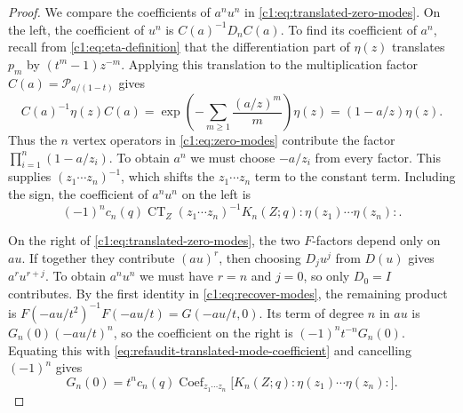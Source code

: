 \documentclass[12pt,reqno,a4paper]{amsart}
\numberwithin{equation}{section}
\numberwithin{figure}{section}
\theoremstyle{plain}
\theoremstyle{definition}
\DeclareMathOperator{\Coef}{Coef}
\begin{document}
\begin{proof}
We compare the coefficients of $a^nu^n$ in \eqref{c1:eq:translated-zero-modes}.
On the left, the coefficient of $u^n$ is $C(a)^{-1}D_nC(a)$.
To find its coefficient of $a^n$, recall from \eqref{c1:eq:eta-definition}
that the differentiation part of $\eta(z)$ translates
$p_m$ by $(t^m-1)z^{-m}$.  Applying this translation to the
multiplication factor $C(a)=\mathcal P_{a/(1-t)}$ gives
\begin{equation}\label{c1:eq:eta-conjugation}
 C(a)^{-1}\eta(z)C(a)
 =\exp\left(-\sum_{m\geq1}\frac{(a/z)^m}{m}\right)\eta(z)
 =(1-a/z)\eta(z).
\end{equation}
Thus the $n$ vertex operators in \eqref{c1:eq:zero-modes} contribute
the factor $\prod_{i=1}^n(1-a/z_i)$.  To obtain $a^n$ we must choose
$-a/z_i$ from every factor.  This supplies $(z_1\cdots z_n)^{-1}$,
which shifts the $z_1\cdots z_n$ term to the constant term.
Including the sign, the coefficient of $a^nu^n$ on the left is
\begin{equation}\label{eq:refaudit-translated-mode-coefficient}
 (-1)^nc_n(q)\operatorname{CT}_Z
 (z_1\cdots z_n)^{-1}K_n(Z;q):\eta(z_1)\cdots\eta(z_n):.
\end{equation}

On the right of \eqref{c1:eq:translated-zero-modes}, the two $F$-factors
depend only on $au$.  If together they contribute $(au)^r$, then
choosing $D_j u^j$ from $D(u)$ gives $a^r u^{r+j}$.
To obtain $a^nu^n$ we must have $r=n$ and $j=0$, so only $D_0=I$
contributes.  By the first identity in \eqref{c1:eq:recover-modes},
the remaining product is
$F(-au/t^2)^{-1}F(-au/t)=G(-au/t,0)$.
Its term of degree $n$ in $au$ is $G_n(0)(-au/t)^n$, so the coefficient
on the right is $(-1)^nt^{-n}G_n(0)$.  Equating this with
\eqref{eq:refaudit-translated-mode-coefficient} and cancelling $(-1)^n$ gives
\begin{equation}\label{c1:eq:nabla-modes}
 G_n(0)=t^nc_n(q)\Coef_{z_1\cdots z_n}
       \bigl[K_n(Z;q):\eta(z_1)\cdots\eta(z_n):\bigr].
\end{equation}


\end{proof}
\end{document}
